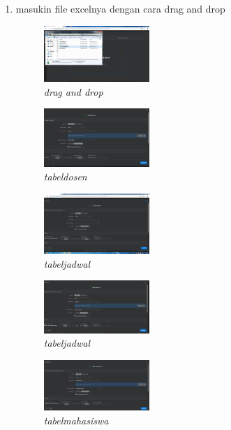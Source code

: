 \documentclass{article}
\begin{document}
\begin{enumerate}
\item masukin file excelnya dengan cara drag and drop
  \begin{figure}[ht]
        \centerline{\includegraphics[width=4cm]{t.png}}
        \caption{\textit{drag and drop}}
    \end{figure}


  \begin{figure}[ht]
        \centerline{\includegraphics[width=4cm]{p.png}}
        \caption{\textit{tabeldosen}}
    \end{figure}

    \begin{figure}[ht]
        \centerline{\includegraphics[width=4cm]{q.png}}
        \caption{\textit{tabeljadwal}}
    \end{figure}


    \begin{figure}[ht]
        \centerline{\includegraphics[width=4cm]{r.png}}
        \caption{\textit{tabeljadwal}}
    \end{figure}
    

    \begin{figure}[ht]
        \centerline{\includegraphics[width=4cm]{s.png}}
        \caption{\textit{tabelmahasiswa}}
    \end{figure}
    

\end{enumerate}
\end{document}

